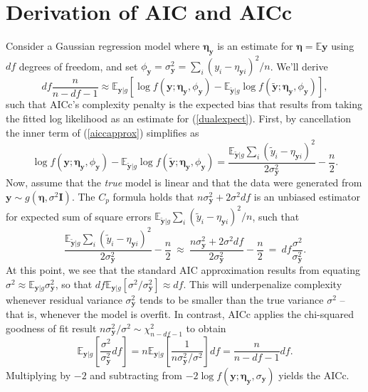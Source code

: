 \documentclass[12pt]{article}
\newcommand{\bs}[1]{\boldsymbol{#1}}
\newcommand{\bm}[1]{\mathbf{#1}}
\newcommand{\ds}[1]{\mathds{#1}}
\begin{document}
\section{Derivation of AIC and AICc}
\label{aicder}

Consider a Gaussian regression model where $\bs{\eta}_\bm{y}$ is an estimate
for $\bs{\eta} = \ds{E}\bm{y}$ using $df$ degrees of freedom, and set $\phi_\bm{y} =
\sigma^2_{\bm{y}} = \sum_i (y_i - \eta_{\bm{y}i})^2/n$. We'll derive
\begin{equation}\label{aiccapprox}
df\frac{n}{n-df-1}  \approx \ds{E}_{\bm{y}|g}\left[\log f(\bm{y}; \bs{\eta}_{\bm{y}},\phi_{\bm{y}}) - \ds{E}_{\bm{\tilde y}|g} \log f(\bm{\tilde y}; \bs{\eta}_{\bm{y}},\phi_{\bm{y}})
\right],
\end{equation}
such that AICc's complexity penalty is the expected bias that results from taking the fitted log likelihood as an estimate for (\ref{dualexpect}).  First, by cancellation the inner term of (\ref{aiccapprox}) simplifies as 
\begin{equation}
\log f(\bm{y}; \bs{\eta}_{\bm{y}},\phi_{\bm{y}}) - \ds{E}_{\bm{\tilde y}|g} \log f(\bm{\tilde y}; \bs{\eta}_{\bm{y}},\phi_{\bm{y}}) = 
\frac{\ds{E}_{\bm{\tilde y}|g} \sum_i (\tilde y_i - \eta_{\bm{y}i})^2}{2 \sigma^2_{\bm{y}}} - \frac{n}{2}.
\end{equation}
Now, assume that the {\it true} model is linear and that the data were generated
from $\bm{y}\sim g(\bs{\eta}, \sigma^2\bm{I})$.  The \cite{mallows_comments_1973} $C_p$ formula holds that 
$n\sigma^2_{\bm{y}} + 2 \sigma^2 df$ is an unbiased estimator for  expected 
sum of square errors $\ds{E}_{\bm{\tilde y}|g} \sum_i (\tilde y_i - \eta_{\bm{y}i})^2/n$, such that
\begin{equation}
\frac{\ds{E}_{\bm{\tilde y}|g} \sum_i (\tilde y_i - \eta_{\bm{y}i})^2}{2 \sigma^2_{\bm{y}}} - \frac{n}{2} 
 ~\approx~ \frac{n\sigma^2_{\bm{y}} + 2 \sigma^2 df}{2 \sigma^2_{\bm{y}}} - \frac{n}{2}
 ~=~  df\frac{\sigma^2 }{\sigma^2_{\bm{y}}}.
\end{equation}
At this point, we see that the standard AIC approximation results from equating $\sigma^2 \approx \ds{E}_{\bm{y}|g}\sigma^2_{\bm{y}}$, so that $df\ds{E}_{\bm{y}|g}[\sigma^2/\sigma^2_{\bm{y}}] \approx df$.  This will underpenalize complexity whenever residual variance $\sigma^2_{\bm{y}}$ tends to be smaller than the true variance $\sigma^2$  -- that is, whenever the model is overfit.  In contrast, AICc applies the chi-squared goodness of fit result $
{n\sigma^2_{\bm{y}}/\sigma^2} \sim \chi^2_{n-df-1}
$
to obtain 
\begin{equation}
\ds{E}_{\bm{y}|g}\left[\frac{\sigma^2 }{\sigma^2_{\bm{y}}}df\right]= 
n\ds{E}_{\bm{y}|g}\left[\frac{1}{n\sigma^2_{\bm{y}}/\sigma^2}\right]df = 
\frac{n}{n-df-1}df.
\end{equation}
Multiplying by $-2$ and subtracting from $-2\log f(\bm{y}; \bs{\eta}_{\bm{y}},\sigma_{\bm{y}})$ yields the AICc.
\end{document}
